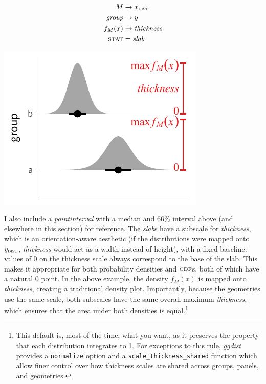 \documentclass[journal]{vgtc}                     %
\begin{document}
\noindent
\begin{minipage}{.5\columnwidth}

\begin{align*}
M &\rightarrow x_\textsc{dist}\\
\textit{group} &\rightarrow y\\
f_M(x) &\rightarrow \textit{thickness}\\
\textsc{stat} &= \mathit{slab}
\end{align*}
\end{minipage}%
  \begin{minipage}{.4\columnwidth}
    \centering
    \includegraphics[width=1.2\columnwidth]{figs/3-slab_density_two_groups.pdf}
  \end{minipage}
\hfill\break

I also include a \textit{pointinterval} with a median and 66\% interval above (and elsewhere in this section) for reference. The \textit{slab}s have a subscale for \textit{thickness}, which is an orientation-aware aesthetic (if the distributions were mapped onto $y_\textsc{dist}$, \textit{thickness} would act as a width instead of height), with a fixed baseline: values of 0 on the thickness scale always correspond to the base of the slab. This makes it appropriate for both probability densities and $\textsc{cdf}$s, both of which have a natural 0 point. In the above example, the density $f_M(x)$ is mapped onto \textit{thickness}, creating a traditional density plot. Importantly, because the geometries use the same scale, both subscales have the same overall maximum \textit{thickness}, which ensures that the area under both densities is equal.\footnote{This default is, most of the time, what you want, as it preserves the property that each distribution integrates to 1. For exceptions to this rule, \textit{ggdist} provides a \texttt{normalize} option and a \texttt{scale\_thickness\_shared} function which allow finer control over how thickness scales are shared across groups, panels, and geometries.} 
\end{document}
